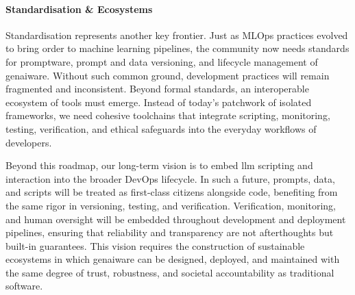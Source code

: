 \documentclass[manuscript,screen]{acmart}
\begin{document}
\paragraph{Standardisation \& Ecosystems}
Standardisation represents another key frontier.
Just as MLOps practices evolved to bring order to machine learning pipelines, the community now needs standards for promptware, prompt and data versioning, and lifecycle management of \ac{genai}ware. %
Without such common ground, development practices will remain fragmented and inconsistent.
Beyond formal standards, an interoperable ecosystem of tools must emerge.
Instead of today's patchwork of isolated frameworks, we need cohesive toolchains that integrate scripting, monitoring, testing, verification, and ethical safeguards into the everyday workflows of developers.

\smallskip
Beyond this roadmap, our long-term vision is to embed \ac{llm} scripting and interaction into the broader DevOps lifecycle.
In such a future, prompts, data, and scripts will be treated as first-class citizens alongside code, benefiting from the same rigor in versioning, testing, and verification.
Verification, monitoring, and human oversight will be embedded throughout development and deployment pipelines, ensuring that reliability and transparency are not afterthoughts but built-in guarantees.
This vision requires the construction of sustainable ecosystems in which \ac{genai}ware %
can be designed, deployed, and maintained with the same degree of trust, robustness, and societal accountability as traditional software.
\end{document}
